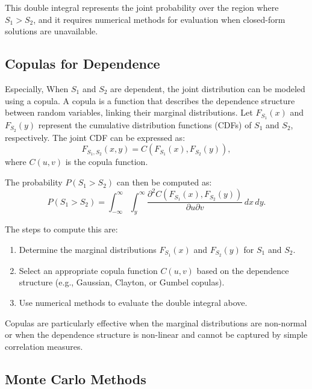 This double integral represents the joint probability over the region where $S_1 > S_2$, and it requires numerical methods for evaluation when closed-form solutions are unavailable.


\subsection{Copulas for Dependence}

Especially, When $S_1$ and $S_2$ are dependent, the joint distribution can be modeled using a copula. A copula is a function that describes the dependence structure between random variables, linking their marginal distributions. Let $F_{S_1}(x)$ and $F_{S_2}(y)$ represent the cumulative distribution functions (CDFs) of $S_1$ and $S_2$, respectively. The joint CDF can be expressed as:
\begin{equation}
F_{S_1, S_2}(x, y) = C(F_{S_1}(x), F_{S_2}(y)),
\end{equation}
where $C(u, v)$ is the copula function.

The probability $P(S_1 > S_2)$ can then be computed as:
\begin{equation}
P(S_1 > S_2) = \int_{-\infty}^\infty \int_{y}^\infty \frac{\partial^2 C(F_{S_1}(x), F_{S_2}(y))}{\partial u \partial v} \, dx \, dy.
\end{equation}

The steps to compute this are:
\begin{enumerate}
    \item Determine the marginal distributions $F_{S_1}(x)$ and $F_{S_2}(y)$ for $S_1$ and $S_2$.
    \item Select an appropriate copula function $C(u, v)$ based on the dependence structure (e.g., Gaussian, Clayton, or Gumbel copulas).
    \item Use numerical methods to evaluate the double integral above.
\end{enumerate}

Copulas are particularly effective when the marginal distributions are non-normal or when the dependence structure is non-linear and cannot be captured by simple correlation measures.

\subsection{Monte Carlo Methods}

